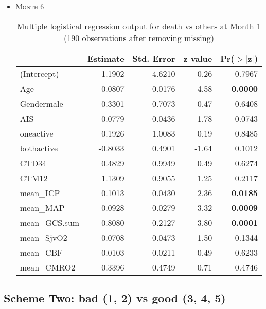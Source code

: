 \documentclass{article}
\begin{document}
\begin{itemize}
\item \textsc{Month 6}
\begin{table}[H]
\centering
\caption{Multiple logistical regression output for death vs others at Month 1 (190 observations after removing missing)}
\begin{tabular}{lrrrr}
  \hline
 & Estimate & Std. Error & z value & Pr($>$$|$z$|$) \\ 
  \hline
(Intercept) & -1.1902 & 4.6210 & -0.26 & 0.7967 \\ 
  Age & 0.0807 & 0.0176 & 4.58 & {\bf 0.0000} \\ 
  Gendermale & 0.3301 & 0.7073 & 0.47 & 0.6408 \\ 
  AIS & 0.0779 & 0.0436 & 1.78 & 0.0743 \\ 
  oneactive & 0.1926 & 1.0083 & 0.19 & 0.8485 \\ 
  bothactive & -0.8033 & 0.4901 & -1.64 & 0.1012 \\ 
  CTD34 & 0.4829 & 0.9949 & 0.49 & 0.6274 \\ 
  CTM12 & 1.1309 & 0.9055 & 1.25 & 0.2117 \\ 
  mean\_ICP & 0.1013 & 0.0430 & 2.36 & {\bf 0.0185} \\ 
  mean\_MAP & -0.0928 & 0.0279 & -3.32 & {\bf 0.0009} \\ 
  mean\_GCS.sum & -0.8080 & 0.2127 & -3.80 & {\bf 0.0001} \\ 
  mean\_SjvO2 & 0.0708 & 0.0473 & 1.50 & 0.1344 \\ 
  mean\_CBF & -0.0103 & 0.0211 & -0.49 & 0.6233 \\ 
  mean\_CMRO2 & 0.3396 & 0.4749 & 0.71 & 0.4746 \\ 
   \hline
\end{tabular}
\end{table}

\end{itemize}




\newpage
\subsection{Scheme Two: bad (1, 2) vs good (3, 4, 5)}
\end{document}
